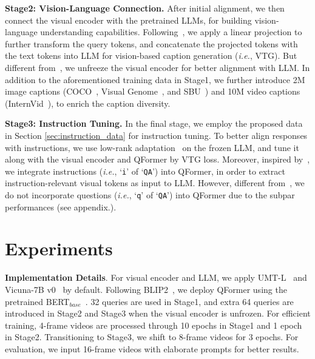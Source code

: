 \textbf{Stage2: Vision-Language Connection.}
After initial alignment,
we then connect the visual encoder with the pretrained LLMs,
for building vision-language understanding capabilities.
Following~\cite{blip2},
we apply a linear projection to further transform the query tokens,
and concatenate the projected tokens with the text tokens into LLM for vision-based caption generation (\textit{i.e.}, VTG).
But different from~\cite{blip2},
we unfreeze the visual encoder for better alignment with LLM.
In addition to the aforementioned training data in Stage1, we further introduce 2M image captions (COCO~\cite{coco}, Visual Genome~\cite{vg}, and SBU~\cite{sbu}) and 10M video captions (InternVid~\cite{internvid}),
to enrich the caption diversity.

\textbf{Stage3: Instruction Tuning.}
In the final stage, 
we employ the proposed data in Section \ref{sec:instruction_data} for instruction tuning. 
To better align responses with instructions,
we use low-rank adaptation~\cite{lora} on the frozen LLM,
and tune it along with the visual encoder and QFormer by VTG loss.
Moreover,
inspired by~\cite{instructblip},
we integrate instructions 
(\textit{i.e.}, `\texttt{i}' of `\texttt{QA}') into QFormer,
in order to extract instruction-relevant visual tokens as input to LLM.
However,
different from~\cite{instructblip},
we do not incorporate questions (\textit{i.e.}, `\texttt{q}' of `\texttt{QA}') into QFormer due to the subpar performances (see appendix.).

\section{Experiments}
\label{sec:exp}

\textbf{Implementation Details}.
For visual encoder and LLM,
we apply UMT-L~\cite{umt} and Vicuna-7B v0~\cite{vicuna} by default.
Following BLIP2~\cite{blip2},
we deploy QFormer using the pretrained BERT$_{base}$~\cite{devlin2018bert}.
32 queries are used in Stage1,
and 
extra 64 queries are introduced in Stage2 and Stage3 when the visual encoder is unfrozen.
For efficient training, 
4-frame videos are processed through 10 epochs in Stage1 and 1 epoch in Stage2. 
Transitioning to Stage3, 
we shift to 8-frame videos for 3 epochs.
For evaluation,
we input 16-frame videos with elaborate prompts for better results.

